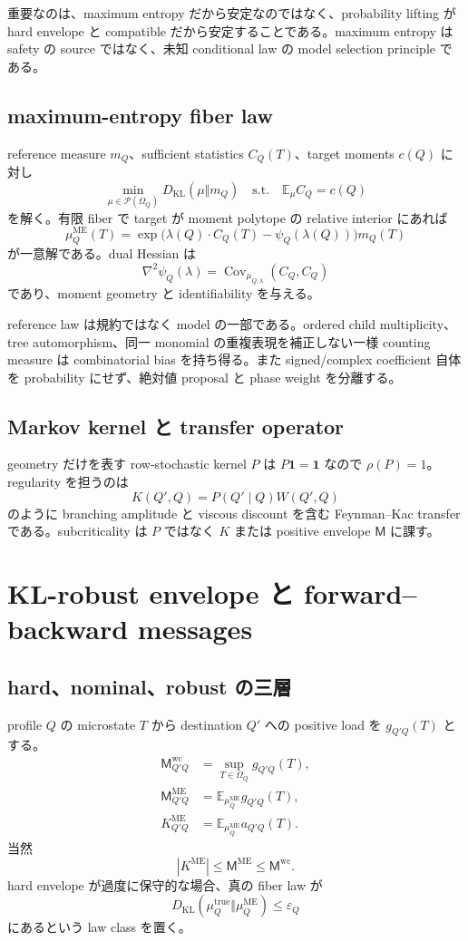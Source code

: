 \documentclass[11pt,a4paper,openany]{book}
\numberwithin{equation}{chapter}
\newcommand{\E}{\mathbb E}
\newcommand{\Cov}{\operatorname{Cov}}
\newcommand{\KL}{D_{\mathrm{KL}}}
\newcommand{\cP}{\mathcal P}
\begin{document}
重要なのは、maximum entropy だから安定なのではなく、probability lifting が hard envelope と compatible だから安定することである。maximum entropy は safety の source ではなく、未知 conditional law の model selection principle である。

\section{maximum-entropy fiber law}
reference measure $m_Q$、sufficient statistics $C_Q(T)$、target moments $c(Q)$ に対し
\[
\min_{\mu\in\cP(\Omega_Q)}\KL(\mu\Vert m_Q)
\quad\text{s.t.}\quad
\E_\mu C_Q=c(Q)
\]
を解く。有限 fiber で target が moment polytope の relative interior にあれば
\[
\mu_Q^{\mathrm{ME}}(T)
=\exp\bigl(\lambda(Q)\cdot C_Q(T)-\psi_Q(\lambda(Q))\bigr)m_Q(T)
\]
が一意解である。dual Hessian は
\[
\nabla^2\psi_Q(\lambda)=\Cov_{\mu_{Q,\lambda}}(C_Q,C_Q)
\]
であり、moment geometry と identifiability を与える。

reference law は規約ではなく model の一部である。ordered child multiplicity、tree automorphism、同一 monomial の重複表現を補正しない一様 counting measure は combinatorial bias を持ち得る。また signed/complex coefficient 自体を probability にせず、絶対値 proposal と phase weight を分離する。

\section{Markov kernel と transfer operator}
geometry だけを表す row-stochastic kernel $P$ は $P\mathbf1=\mathbf1$ なので $\rho(P)=1$。regularity を担うのは
\[
K(Q',Q)=P(Q'\mid Q)W(Q',Q)
\]
のように branching amplitude と viscous discount を含む Feynman--Kac transfer である。subcriticality は $P$ ではなく $K$ または positive envelope $\mathsf M$ に課す。

\chapter{KL-robust envelope と forward--backward messages}
\section{hard、nominal、robust の三層}
profile $Q$ の microstate $T$ から destination $Q'$ への positive load を $g_{Q'Q}(T)$ とする。
\begin{align}
\mathsf M_{Q'Q}^{\mathrm{wc}}
&=\sup_{T\in\Omega_Q}g_{Q'Q}(T),\\
\mathsf M_{Q'Q}^{\mathrm{ME}}
&=\E_{\mu_Q^{\mathrm{ME}}}g_{Q'Q}(T),\\
K_{Q'Q}^{\mathrm{ME}}
&=\E_{\mu_Q^{\mathrm{ME}}}a_{Q'Q}(T).
\end{align}
当然
\[
|K^{\mathrm{ME}}|
\le\mathsf M^{\mathrm{ME}}
\le\mathsf M^{\mathrm{wc}}.
\]
hard envelope が過度に保守的な場合、真の fiber law が
\[
\KL(\mu_Q^{\mathrm{true}}\Vert\mu_Q^{\mathrm{ME}})
\le\varepsilon_Q
\]
にあるという law class を置く。
\end{document}

